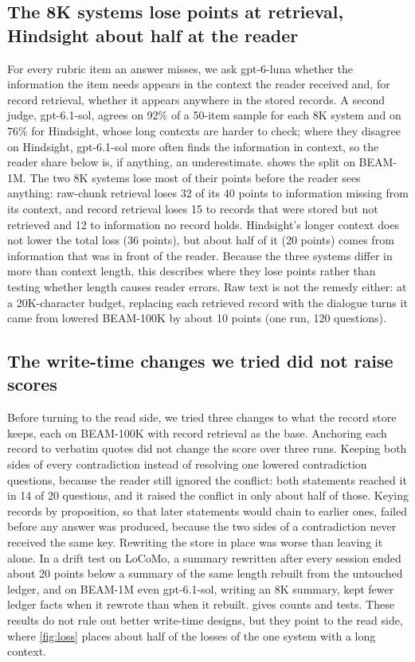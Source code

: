 \subsection{The 8K systems lose points at retrieval, Hindsight about half at the reader}
\label{sec:audit-loss}
For every rubric item an answer misses, we ask gpt-6-luna whether the information the item needs appears in the
context the reader received and, for record retrieval, whether it appears anywhere in the stored records. A second
judge, gpt-6.1-sol, agrees on 92\% of a 50-item sample for each 8K system and on 76\% for Hindsight, whose long
contexts are harder to check; where they disagree on Hindsight, gpt-6.1-sol more often finds the information in
context, so the reader share below is, if anything, an underestimate.  shows the split on BEAM-1M. The
two 8K systems lose most of their points before the reader sees anything: raw-chunk retrieval loses 32 of its 40
points to information missing from its context, and record retrieval loses 15 to records that were stored but not
retrieved and 12 to information no record holds. Hindsight's longer context does not lower the total loss (36 points),
but about half of it (20 points) comes from information that was in front of the reader. Because the three systems
differ in more than context length, this describes where they lose points rather than testing whether length causes
reader errors. Raw text is not the remedy either: at a 20K-character budget, replacing each retrieved record with the
dialogue turns it came from lowered BEAM-100K by about 10 points (one run, 120 questions).

\subsection{The write-time changes we tried did not raise scores}
\label{sec:audit-write}
Before turning to the read side, we tried three changes to what the record store keeps, each on BEAM-100K with record
retrieval as the base. Anchoring each record to verbatim quotes did not change the score over three runs. Keeping both
sides of every contradiction instead of resolving one lowered contradiction questions, because the reader still
ignored the conflict: both statements reached it in 14 of 20 questions, and it raised the conflict in only about half
of those. Keying records by proposition, so that later statements would chain to earlier ones, failed before any
answer was produced, because the two sides of a contradiction never received the same key. Rewriting the store in
place was worse than leaving it alone. In a drift test on LoCoMo, a summary rewritten after every session ended about
20 points below a summary of the same length rebuilt from the untouched ledger, and on BEAM-1M even gpt-6.1-sol, writing
an 8K summary, kept fewer ledger facts when it rewrote than when it rebuilt.  gives counts and tests.
These results do not rule out better write-time designs, but they point to the read side, where \cref{fig:loss} places
about half of the losses of the one system with a long context.
